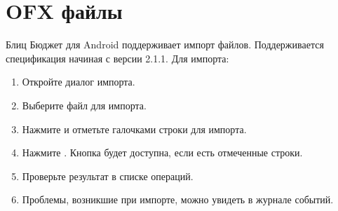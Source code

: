 \documentclass[a4paper,10pt,russian]{sphinxmanual}
\begin{document}
\section{OFX файлы}
\label{\detokenize{import:id6}}
\sphinxAtStartPar
Блиц Бюджет для Android поддерживает импорт  файлов. Поддерживается спецификация начиная с версии 2.1.1. Для импорта:
\begin{enumerate}
%
\item {} 
\sphinxAtStartPar
Откройте диалог импорта.

\item {} 
\sphinxAtStartPar
Выберите файл для импорта.

\item {} 
\sphinxAtStartPar
Нажмите  и отметьте галочками строки для импорта.

\item {} 
\sphinxAtStartPar
Нажмите . Кнопка будет доступна, если есть отмеченные строки.

\item {} 
\sphinxAtStartPar
Проверьте результат в списке операций.

\item {} 
\sphinxAtStartPar
Проблемы, возникшие при импорте, можно увидеть в журнале событий.

\end{enumerate}

\noindent{}

\noindent{}
\end{document}
